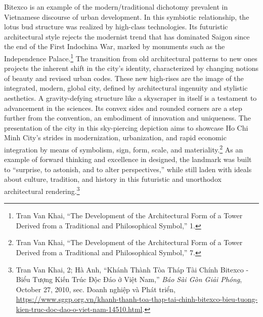 Bitexco is an example of the modern/traditional dichotomy prevalent in Vietnamese discourse of urban development. In this symbiotic relationship, the lotus bud structure was realized by high-class technologies. Its futuristic architectural style rejects the modernist trend that has dominated Saigon since the end of the First Indochina War, marked by monuments such as the Independence Palace.\footnote{Tran Van Khai, “The Development of the Architectural Form of a Tower Derived from a Traditional and Philosophical Symbol,” 1.} The transition from old architectural patterns to new ones projects the inherent shift in the city’s identity, characterized by changing notions of beauty and revised urban codes. These new high-rises are the image of the integrated, modern, global city, defined by architectural ingenuity and stylistic aesthetics. A gravity-defying structure like a skyscraper in itself is a testament to advancement in the sciences. Its convex sides and rounded corners are a step further from the convention, an embodiment of innovation and uniqueness. The presentation of the city in this sky-piercing depiction aims to showcase Ho Chi Minh City's strides in modernization, urbanization, and rapid economic integration by means of symbolism, sign, form, scale, and materiality.\footnote{Tran Van Khai, “The Development of the Architectural Form of a Tower Derived from a Traditional and Philosophical Symbol,” 7.} As an example of forward thinking and excellence in designed, the landmark was built to “surprise, to astonish, and to alter perspectives,” while still laden with ideals about culture, tradition, and history in this futuristic and unorthodox architectural rendering.\footnote{Tran Van Khai, 2; Hà Anh, “Khánh Thành Tòa Tháp Tài Chính Bitexco - Biểu Tượng Kiến Trúc Độc Đáo ở Việt Nam,” \textit{Báo Sài Gòn Giải Phóng}, October 27, 2010, sec. Doanh nghiệp và Phát triển, \url{https://www.sggp.org.vn/khanh-thanh-toa-thap-tai-chinh-bitexco-bieu-tuong-kien-truc-doc-dao-o-viet-nam-14510.html}.}

